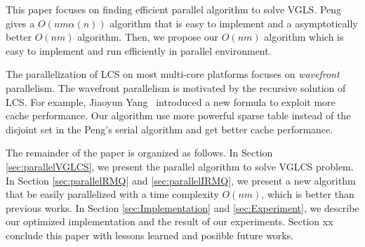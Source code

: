 This paper focuses on finding efficient parallel algorithm to solve
VGLS.  Peng~\cite{Peng2011TheLC} gives a $O(nm \alpha(n))$ algorithm
that is easy to implement and a asymptotically better $O(nm)$
algorithm.  Then, we propose our $O(nm)$ algorithm which is easy to
implement and run efficiently in parallel environment.


The parallelization of LCS on most multi-core platforms focuses on {\em
wavefront} parallelism.  The wavefront parallelism is motivated by the
recursive solution of LCS.  For example, Jiaoyun
Yang~\cite{Yang2010AnEP} introduced a new formula to exploit more
cache performance.  Our algorithm use more powerful sparse table
instead of the disjoint set in the Peng's serial algorithm and get
better cache performance.


\iffalse 在約束條件下的 LCS 中，如 \emph{fixed gap LCS } (FGLCS)要求任
兩個挑選的距離在相對應的另一個字串中相等，同時距離最大為 $k+1$，可在時
間複雜度在 $O(nm)$ 內解決，其中 $n$, $m$ 分別為兩個輸入的字串長度。我
們將在這篇論文針對 \emph{variable gap LCS} (VGLCS) 進行探討。在 VGLCS
中，對各個不同的位置提供約束限制，如目前給定兩個字串 $A =
\tt{GCGCAATG}$, $B = \tt{GCCCTAGCG}$，各自的約束限制為 $G_A = [3, 1,
  1, 2, 0, 0, 2, 1]$ 和 $G_B = [2, 0, 3, 2, 0, 1, 2, 0, 1]$，其中
$G_A(i)$ 表示當挑選第 $i$ 個位置時，與前一個挑選的位置最多差
$G_A(i)+1$，同理 $G_B(i)$；我們可以得到兩組 VGLCS 的解
$\tt{G..C..C..A}$ 和 $\tt{G..C..C..T}$，挑選的方式如圖
~\ref{fig:VGLCSex}。在 Yung-Hsing Peng ~\cite{yunghsing} 的論文已對
VGLCS 提出易於實作的 $O(nm \alpha(n))$ 和理論 $O(nm)$ 的解法。\fi


The remainder of the paper is organized as follows.  In Section
\ref{sec:parallelVGLCS}, we present the parallel algorithm to solve
VGLCS problem.  In Section \ref{sec:parallelRMQ} and
\ref{sec:parallelIRMQ}, we present a new algorithm that be easily
parallelized with a time complexity $O(nm)$, which is better than
previous works.  In Section \ref{sec:Implementation} and
\ref{sec:Experiment}, we describe our optimized implementation and the
result of our experiments. Section xx conclude this paper with lessons
learned and posiible future works.

\iffalse 這一篇論文，我們將在第二 \ref{sec:parallelVGLCS} 節部分將
Yung-Hsing Peng ~\cite{yunghsing} 提出的算法進行平行化。在第三節
~\ref{sec:parallelRMQ}，在理論分析上提供易平行且時間複雜度 $O(nm)$ 的
設計。在第四節 ~\ref{sec:Implementation}，我們將藉由快取忘卻
(cache-oblivious) 技術，在實作上提供更好的效能。最後，我們總結實驗結果
與理論實務上的差異。\fi

